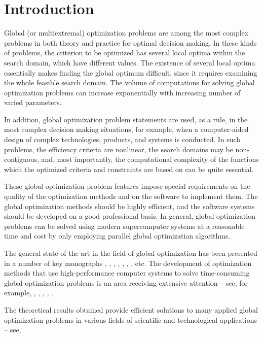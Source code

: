 \documentclass{gOMS2e}
\theoremstyle{plain}%
\theoremstyle{definition}
\theoremstyle{remark}
\begin{document}
\section{Introduction}
\label{sec:intro}
Global (or multiextremal) optimization problems are among the most complex problems
in both theory and practice for optimal decision making. In these kinds of problems,
the criterion to be optimized has several local optima within the search domain,
which have different values. The existence of several local optima essentially makes
finding the global optimum difficult, since it requires examining the whole feasible
search domain. The volume of computations for solving global optimization problems
can increase exponentially with increasing number of varied parameters.
\par
In addition, global optimization problem statements are used, as a rule, in the most
complex decision making situations, for example, when a computer-aided design of complex
technologies, products, and systems is conducted. In such problems, the efficiency
criteria are nonlinear, the search domains may be non-contiguous, and, most importantly,
the computational complexity of the functions which the optimized criteria and constraints
are based on can be quite essential.
\par
These global optimization problem features impose special requirements on the quality of
the optimization methods and on the software to implement them. The global optimization
methods should be highly efficient, and the software systems should be developed on a good
professional basis. In general, global optimization problems can be solved using modern
supercomputer systems at a reasonable time and cost by only employing parallel
global optimization algorithms.
\par
The general state of the art in the field of global optimization has been presented in a
number of key monographs \cite{zilinskTornGO}, \cite{horstTuyGO}, \cite{zhigljavskyRandGO},
\cite{pinterGO}, \cite{strSergGO}, \cite{locatelliSchoenGO}, \cite{floudasPardGO}, etc.
The development of optimization methods that use high-performance computer systems to
solve time-consuming global optimization problems is an area receiving extensive
attention – see, for example, \cite{censorZeniosParGO}, \cite{strSergGO},
\cite{ciegisHentyParGO}, \cite{luqueAlbaGA}, \cite{stronginGergelBarkalovParGO}.
\par
The theoretical results obtained provide efficient solutions to many applied global
optimization problems in various fields of scientific and technological applications – see,
\end{document}
